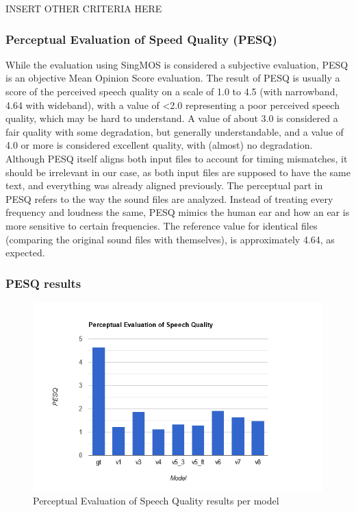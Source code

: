 \documentclass[a4paper]{article}
\begin{document}
\color{red}INSERT OTHER CRITERIA HERE\color{black}

\subsubsection*{Perceptual Evaluation of Speed Quality (PESQ)}
While the evaluation using SingMOS is considered a subjective evaluation, PESQ
is an objective Mean Opinion Score evaluation. The result of PESQ is usually a
score of the perceived speech quality on a scale of 1.0 to 4.5 (with narrowband,
4.64 with wideband), with a value of <2.0 representing a poor perceived speech
quality, which may be hard to understand. A value of about 3.0 is considered a
fair quality with some degradation, but generally understandable, and a value of
4.0 or more is considered excellent quality, with (almost) no degradation.
Although PESQ itself aligns both input files to account for timing mismatches,
it should be irrelevant in our case, as both input files are supposed to have
the same text, and everything was already aligned previously. The perceptual
part in PESQ refers to the way the sound files are analyzed. Instead of treating
every frequency and loudness the same, PESQ mimics the human ear and how an ear
is more sensitive to certain frequencies. The reference value for identical
files (comparing the original sound files with themselves), is approximately 4.64, as
expected.

\subsubsection*{PESQ results}
\begin{figure}[hbtp]
    \includegraphics[width=\textwidth]{evaluation/graphs/PESQ.png}
    \caption{Perceptual Evaluation of Speech Quality results per model}
    \label{fig:pesq_results}
\end{figure}
\end{document}

